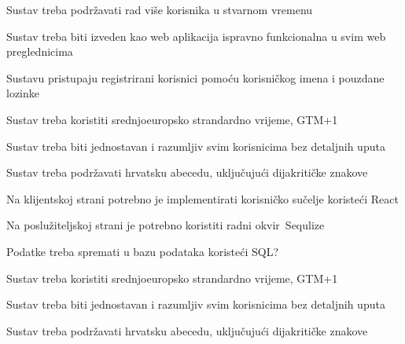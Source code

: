 			\begin{packed_item}

				\item Sustav treba podržavati rad više korisnika u stvarnom vremenu
				\item Sustav treba biti izveden kao web aplikacija ispravno funkcionalna u svim web preglednicima
				\item	 Sustavu pristupaju registrirani korisnici pomoću korisničkog imena i pouzdane lozinke
				\item Sustav treba koristiti srednjoeuropsko strandardno vrijeme, GTM+1
				\item Sustav treba biti jednostavan i razumljiv svim korisnicima bez detaljnih uputa
				\item Sustav treba podržavati hrvatsku abecedu, uključujući dijakritičke znakove
				\item Na klijentskoj strani potrebno je implementirati korisničko sučelje koristeći React
				\item Na poslužiteljskoj strani je potrebno koristiti radni okvir Sequlize
				\item Podatke treba spremati u bazu podataka koristeći SQL?
				\item Sustav treba koristiti srednjoeuropsko strandardno vrijeme, GTM+1
				\item Sustav treba biti jednostavan i razumljiv svim korisnicima bez detaljnih uputa
				\item Sustav treba podržavati hrvatsku abecedu, uključujući dijakritičke znakove
			\end{packed_item}

			 
			 
	